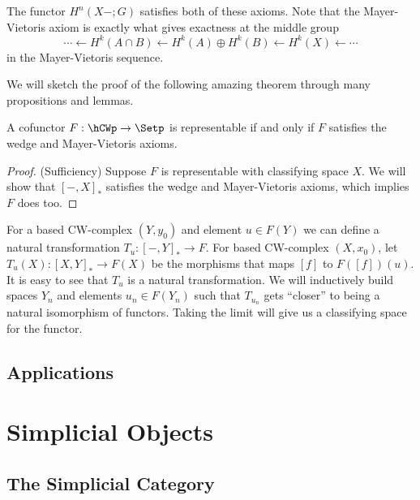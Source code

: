 The functor $H^n(X-;G)$ satisfies both of these axioms. Note that the Mayer-Vietoris axiom is exactly what gives exactness at the middle group
\[ \cdots \longleftarrow H^k(A \cap B) \longleftarrow H^k(A) \oplus H^k(B) \longleftarrow H^k(X) \longleftarrow \cdots \]
in the Mayer-Vietoris sequence.

We will sketch the proof of the following amazing theorem through many propositions and lemmas.
\begin{thm}
A cofunctor $F : \hCWp \rightarrow \Setp$ is representable if and only if $F$ satisfies the wedge and Mayer-Vietoris axioms.
\end{thm}
\begin{proof}(Sufficiency)
Suppose $F$ is representable with classifying space $X$. We will show that $[-,X]_*$ satisfies the wedge and Mayer-Vietoris axioms, which implies $F$ does too. 
\end{proof}

For a based CW-complex $(Y,y_0)$ and element $u \in F(Y)$ we can define a natural transformation $T_u : [-,Y]_* \rightarrow F$. For based CW-complex $(X,x_0)$, let $T_u(X) : [X,Y]_* \rightarrow F(X)$ be the morphisms that maps $[f]$ to $F([f])(u)$. It is easy to see that $T_u$ is a natural transformation. We will inductively build spaces $Y_n$ and elements $u_n \in F(Y_n)$ such that $T_{u_n}$ gets ``closer'' to being a natural isomorphism of functors. Taking the limit will give us a classifying space for the functor.


\subsection{Applications}







\newpage
\section{Simplicial Objects}


\subsection{The Simplicial Category}



